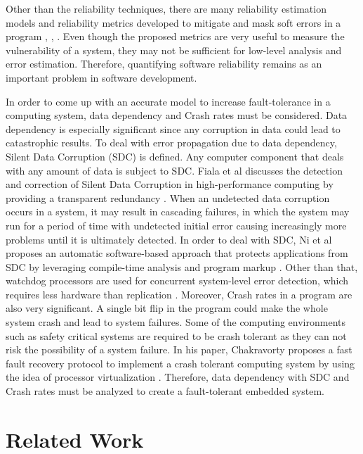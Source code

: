Other than the reliability techniques, there are many reliability estimation models and reliability metrics developed to mitigate and mask soft errors in a program \cite{Barraza:2017}, \cite{Reliability_metric:2008}, \cite{Singh:2013}. Even though the proposed metrics are very useful to measure the vulnerability of a system, they may not be sufficient for low-level analysis and error estimation. Therefore, quantifying software reliability remains as an important problem in software development. 

In order to come up with an accurate model to increase fault-tolerance in a computing system, data dependency and Crash rates must be considered. Data dependency is especially significant since any corruption in data could lead to catastrophic results. To deal with error propagation due to data dependency, Silent Data Corruption (SDC) is defined. Any computer component that deals with any amount of data is subject to SDC. Fiala et al discusses the detection and correction of Silent Data Corruption in high-performance computing by providing a transparent redundancy \cite{Fiala:2012}. When an undetected data corruption occurs in a system, it may result in cascading failures, in which the system may run for a period of time with undetected initial error causing increasingly more problems until it is ultimately detected. In order to deal with SDC, Ni et al proposes an automatic software-based approach that protects applications from SDC by leveraging compile-time analysis and program markup \cite{Ni:2016}. Other than that, watchdog processors are used for concurrent system-level error detection, which requires less hardware than replication \cite{Mahmood:1988}. Moreover, Crash rates in a program are also very significant. A single bit flip in the program could make the whole system crash and lead to system failures. Some of the computing environments such as safety critical systems are required to be crash tolerant as they can not risk the possibility of a system failure. In his paper, Chakravorty proposes a fast fault recovery protocol to implement a crash tolerant computing system by using the idea of processor virtualization \cite{Chakravorty:2007}. Therefore, data dependency with SDC and Crash rates must be analyzed to create a fault-tolerant embedded system. 

\section{Related Work}

